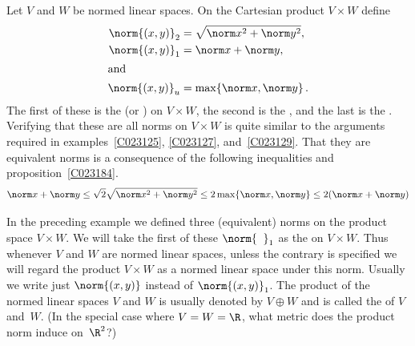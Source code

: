 \begin{exam}\label{C023411} Let $V$ and $W$ be normed linear spaces. On the Cartesian product
$V \times W$ define
 \begin{align*}
    \norm{(x,y)}_2 &= \sqrt{\norm x^2 + \norm y^2},  \\
    \norm{(x,y)}_1 &= \norm x + \norm y,  \\
   \intertext{and}
    \norm{(x,y)}_u &= \max\{\norm x, \norm y\}\,.
 \end{align*}
The first of these is the
 (or
) on $V \times W$, the second is the
, and the last is the
. Verifying that these are all norms on $V \times W$ is quite similar to
the arguments required in examples~\ref{C023125}, \ref{C023127}, and~\ref{C023129}. That
they are equivalent norms is a consequence of the following inequalities and
proposition~\ref{C023184}.
   \[ \norm x + \norm y \le \sqrt 2 \sqrt{\norm x^2 + \norm y^2} \le 2 \max\{\norm x,\norm y\} \le 2(\norm x + \norm y) \]
\end{exam}

\begin{conv}\label{C023414} In the preceding example we defined three (equivalent) norms on
the product space $V \times W$.  We will take the first of these $\norm{\;\;}_1$ as the
 on $V \times W$.  Thus whenever $V$ and $W$ are normed linear spaces,
unless the contrary is specified we will regard the product $V \times W$ as a normed
linear space under this norm.  Usually we write just $\norm{(x,y)}$ instead of
$\norm{(x,y)}_1$.  The product of the normed linear spaces $V$ and $W$ is usually denoted
by $V \oplus W$ and is called the
 of $V$ and~$W$. (In the special case where $V = W = \R$, what metric does
the product norm induce on~$\R^2$?)
\end{conv}

